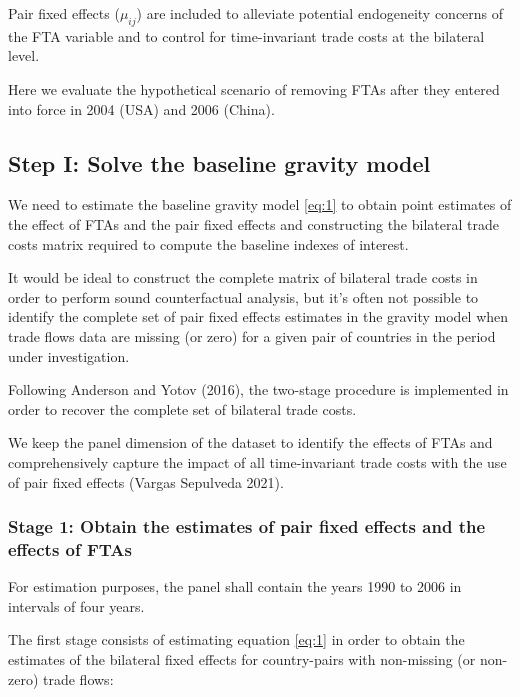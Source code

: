 \documentclass[10pt]{article}
\begin{document}
Pair fixed effects (\(\mu_{ij}\)) are included to alleviate potential
endogeneity concerns of the FTA variable and to control for
time-invariant trade costs at the bilateral level.

Here we evaluate the hypothetical scenario of removing FTAs after they
entered into force in 2004 (USA) and 2006 (China).

\hypertarget{step-i-solve-the-baseline-gravity-model}{%
\subsection{Step I: Solve the baseline gravity
model}\label{step-i-solve-the-baseline-gravity-model}}

We need to estimate the baseline gravity model \eqref{eq:1} to obtain
point estimates of the effect of FTAs and the pair fixed effects and
constructing the bilateral trade costs matrix required to compute the
baseline indexes of interest.

It would be ideal to construct the complete matrix of bilateral trade
costs in order to perform sound counterfactual analysis, but it's often
not possible to identify the complete set of pair fixed effects
estimates in the gravity model when trade flows data are missing (or
zero) for a given pair of countries in the period under investigation.

Following Anderson and Yotov (2016), the two-stage procedure is
implemented in order to recover the complete set of bilateral trade
costs.

We keep the panel dimension of the dataset to identify the effects of
FTAs and comprehensively capture the impact of all time-invariant trade
costs with the use of pair fixed effects (Vargas Sepulveda 2021).

\hypertarget{stage-1-obtain-the-estimates-of-pair-fixed-effects-and-the-effects-of-ftas}{%
\subsubsection{Stage 1: Obtain the estimates of pair fixed effects and
the effects of
FTAs}\label{stage-1-obtain-the-estimates-of-pair-fixed-effects-and-the-effects-of-ftas}}

For estimation purposes, the panel shall contain the years 1990 to 2006
in intervals of four years.

The first stage consists of estimating equation \eqref{eq:1} in order to
obtain the estimates of the bilateral fixed effects for country-pairs
with non-missing (or non-zero) trade flows:
\end{document}
